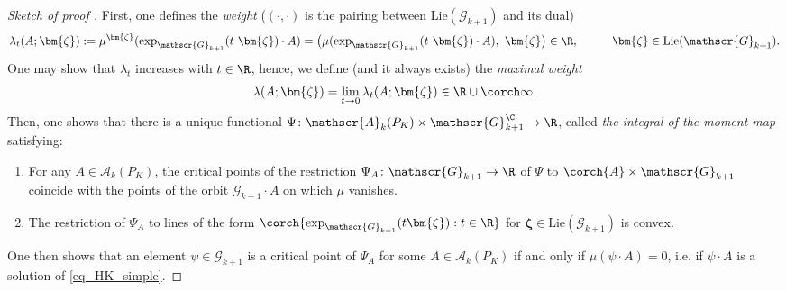 \begin{proof}[\textit{Sketch of proof } \parencite{i1999hitchin}]
    First, one defines the \textit{weight} (\((\cdot, \cdot)\) is the pairing between \(\mathrm{Lie}(\mathscr{G}_{k+1})\) and its dual)
    \[
    \lambda_t(A; \bm{\zeta}):=\mu^{\bm{\zeta}}(\exp_{\mathscr{G}_{k+1}}(t\  \bm{\zeta})\cdot A)=\big(\mu(\exp_{\mathscr{G}_{k+1}}(t \ \bm{\zeta})\cdot A) , \  \bm{\zeta} \big) \in \R, \hspace{1 cm} \bm{\zeta} \in \mathrm{Lie}(\mathscr{G}_{k+1}).
    \]
    One may show that \(\lambda_t\) increases with \(t\in \R\), hence, we define (and it always exists) the \textit{maximal weight}
    \[
    \lambda(A; \bm{\zeta})=\lim_{t \to 0} \lambda_t(A; \bm{\zeta}) \in \R \cup \corch\infty.
    \]
    Then, one shows that there is a unique functional \(\Psi\colon \mathscr{A}_k(P_K) \times \mathscr{G}_{k+1}^\C \to \R\), called \textit{the integral of the moment map} satisfying:
    \begin{enumerate}
        \item For any \(A \in \mathscr{A}_k(P_K)\), the critical points of the restriction \(\Psi_A\colon \mathscr{G}_{k+1} \to \R\) of \(\Psi\) to \(\corch{A} \times \mathscr{G}_{k+1}\) coincide with the points of the orbit \(\mathscr{G}_{k+1}\cdot A\) on which \(\mu\) vanishes.
        \item The restriction of \(\Psi_A\) to lines of the form \(\corch{\exp_{\mathscr{G}_{k+1}}(t\bm{\zeta}): t \in \R}\) for \(\bm{\zeta} \in \mathrm{Lie}(\mathscr{G}_{k+1})\) is convex.
    \end{enumerate}
    One then shows that an element \(\psi \in \mathscr{G}_{k+1}\) is a critical point of \(\Psi_A\) for some \(A \in \mathscr{A}_k(P_K)\) if and only if \(\mu(\psi\cdot A)=0\), i.e. if \(\psi\cdot A\) is a solution of \eqref{eq_HK_simple}.  
    

\end{proof}
